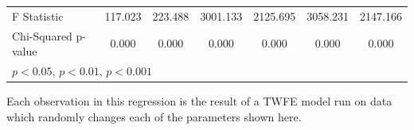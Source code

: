 \documentclass[12pt]{article}
\begin{document}
\begin{table}[htbp]
{\begin{tabular}{p{4.5in}|*{6}{c}}
F Statistic         &     117.023         &     223.488         &    3001.133         &    2125.695         &    3058.231         &    2147.166         \\
Chi-Squared p-value &       0.000         &       0.000         &       0.000         &       0.000         &       0.000         &       0.000         \\
\hline\hline
\multicolumn{7}{l}{\footnotesize \sym{*} \(p<0.05\), \sym{**} \(p<0.01\), \sym{***} \(p<0.001\)}\\
\end{tabular}
}
\footnotesize  
\vspace{5mm}
    \footnotesize \begin{singlespace*}
        Each observation in this regression is the result of a TWFE model run on data which randomly changes each of the parameters shown here.
    \end{singlespace*}
\end{table}
\end{document}

